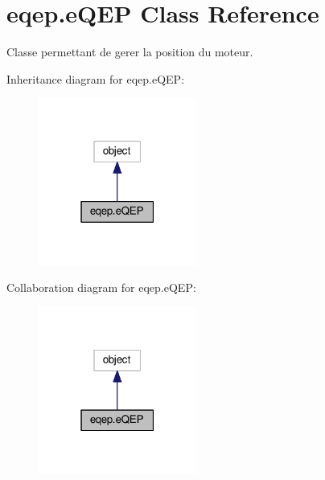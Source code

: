 \hypertarget{classeqep_1_1eQEP}{}\section{eqep.\+e\+Q\+EP Class Reference}
\label{classeqep_1_1eQEP}


Classe permettant de gerer la position du moteur.  




Inheritance diagram for eqep.\+e\+Q\+EP\+:
\nopagebreak
\begin{figure}[H]
\begin{center}
\leavevmode
\includegraphics[width=147pt]{classeqep_1_1eQEP__inherit__graph}
\end{center}
\end{figure}


Collaboration diagram for eqep.\+e\+Q\+EP\+:
\nopagebreak
\begin{figure}[H]
\begin{center}
\leavevmode
\includegraphics[width=147pt]{classeqep_1_1eQEP__coll__graph}
\end{center}
\end{figure}
